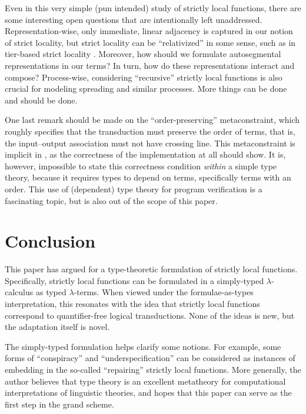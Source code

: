 \documentclass[11pt]{article}
\theoremstyle{definition}
\theoremstyle{plain}
\begin{document}
Even in this very simple (pun intended) study of strictly local
functions, there are some interesting open questions that are
intentionally left unaddressed.  Representation-wise, only immediate,
linear adjacency is captured in our notion of strict locality, but
strict locality can be \enquote{relativized} in some sense, such as in
tier-based strict locality \citep{hrt11tslcp}.  Moreover, how should
we formulate autosegmental representations in our terms?  In turn, how
do these representations interact and compose?  Process-wise,
considering \enquote{recursive} strictly local functions is also
crucial for modeling spreading and similar processes.  More things
can be done and should be done.

One last remark should be made on the \enquote{order-preserving}
metaconstraint, which roughly specifies that the transduction must
preserve the order of terms, that is, the input--output association
must not have crossing line.  This metaconstraint is implicit in
, as the correctness of the implementation at
all should show.  It is, however, impossible to state this correctness
condition \emph{within} a simple type theory, because it requires
types to depend on terms, specifically terms with an order.  This use
of (dependent) type theory for program verification is a fascinating
topic, but is also out of the scope of this paper.

\section{Conclusion}
This paper has argued for a type-theoretic formulation of strictly
local functions.  Specifically, strictly local functions can be
formulated in a simply-typed \(\lambda\)-calculus as typed
\(\lambda\)-terms.  When viewed under the formulae-as-types
interpretation, this resonates with the idea that strictly local
functions correspond to quantifier-free logical transductions.  None
of the ideas is new, but the adaptation itself is novel.

The simply-typed formulation helps clarify some notions.  For example,
some forms of \enquote{conspiracy} and \enquote{underspecification}
can be considered as instances of embedding in the so-called
\enquote{repairing} strictly local functions.  More generally, the
author believes that type theory is an excellent metatheory for
computational interpretations of linguistic theories, and hopes that
this paper can serve as the first step in the grand scheme.
\end{document}

